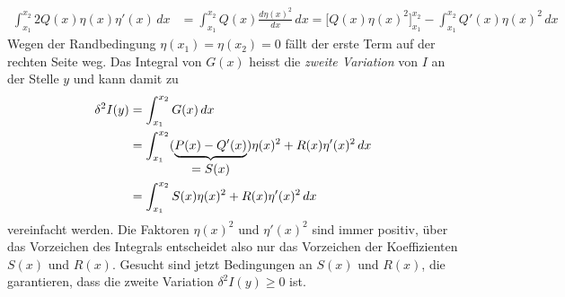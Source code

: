 \begin{align*}
\int_{x_1}^{x_2}
2Q(x)\eta(x)\eta'(x)
\,dx
&=
\int_{x_1}^{x_2}
Q(x) \frac{d\eta(x)^2}{dx}
\,dx
=
\biggl[Q(x)\eta(x)^2\biggr]_{x_1}^{x_2}
-
\int_{x_1}^{x_2} Q'(x) \eta(x)^2\,dx
\end{align*}
Wegen der Randbedingung $\eta(x_1)=\eta(x_2)=0$ fällt der
erste Term auf der rechten Seite weg.
Das Integral von $G(x)$ heisst die {\em zweite Variation} von $I$ an der
%
%
Stelle $y$ und kann damit zu
\begin{align}
\delta^2 I(y)
&=
\int_{x_1}^{x_2} G(x)\,dx
\notag
\\
&=
\int_{x_1}^{x_2}
(\underbrace{P(x)-Q'(x)}_{\displaystyle = S(x)}) \eta(x)^2
+
R(x)\eta'(x)^2
\,dx
\notag
\\
&=
\int_{x_1}^{x_2}
S(x)\eta(x)^2 + R(x)\eta'(x)^2
\,dx
\label{buch:variation2:zweitevariation:eqn:SRintegral}
\end{align}
vereinfacht werden.
Die Faktoren $\eta(x)^2$ und $\eta'(x)^2$ sind immer positiv,
über das Vorzeichen des Integrals entscheidet also nur das Vorzeichen
der Koeffizienten $S(x)$ und $R(x)$.
Gesucht sind jetzt Bedingungen an $S(x)$ und $R(x)$, die garantieren,
dass die zweite Variation $\delta^2 I(y)\ge 0$ ist.



